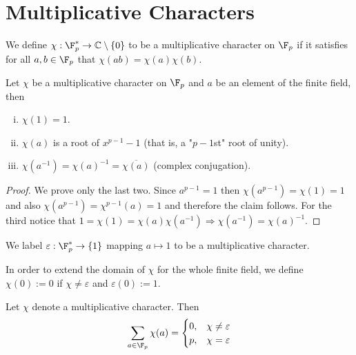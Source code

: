 \section{Multiplicative Characters}

\begin{definition}
    We define \(\chi : \F_p^{\ast} \to \mathbb{C} \setminus \{0\}\) to be a
    multiplicative character on \(\F_p\) if it satisfies for all \(a, b \in
    \F_p\) that \(\chi(ab) = \chi(a)\chi(b)\).
\end{definition}

\begin{proposition}
    Let \(\chi\) be a multiplicative character on \(\F_p\) and \(a\) be an
    element of the finite field, then
    \begin{enumerate}[i.]
        \item \(\chi(1) = 1\).
        \item  \(\chi(a)\) is a root of \(x^{p-1} - 1\) (that is, a "\(p-1\)st"
              root of unity).
        \item \(\chi(a^{-1}) = \chi(a)^{-1} = \overline{\chi(a)}\) (complex
              conjugation).
    \end{enumerate}
\end{proposition}

\begin{proof}
    We prove only the last two. Since \(a^{p-1} = 1\) then  \(\chi(a^{p-1}) =
    \chi(1) = 1\) and also  \(\chi(a^{p-1}) = \chi^{p-1}(a) = 1\) and therefore
    the claim follows.
    For the third notice that \(1 = \chi(1) = \chi(a)\chi(a^{-1}) \Rightarrow
    \chi(a^{-1}) = \chi(a)^{-1}\).
\end{proof}

\begin{definition}
    We label \(\varepsilon : \F_p^\ast \to \{1\}\) mapping \(a \mapsto 1\) to be
    a multiplicative character.
\end{definition}

In order to extend the domain of \(\chi\) for the whole finite field, we define
\(\chi(0) := 0\) if  \(\chi \neq  \varepsilon\) and \(\varepsilon(0) := 1\).

\begin{proposition}\label{prop: sum multiplicative characters}
    Let \(\chi\) denote a multiplicative character. Then
    \[
        \sum_{a \in \F_p} \chi(a) =
        \begin{cases}
            0, & \chi \neq \varepsilon \\
            p, & \chi = \varepsilon
        \end{cases}
    \]
\end{proposition}

